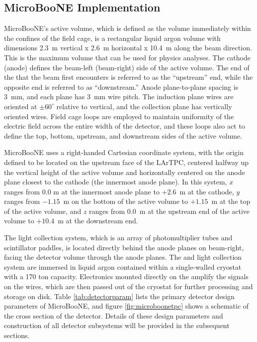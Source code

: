 


\subsection{MicroBooNE \lartpc Implementation}

MicroBooNE's \lartpc active volume, which is defined as the volume immediately within the confines of the \lartpc field cage, is a rectangular liquid argon volume with dimensions 2.3~m vertical x 2.6~m horizontal x 10.4~m along the beam direction. This is the maximum volume that can be used for physics analyses.  The cathode (anode) defines the beam-left (beam-right) side of the active volume.  The end of the \lartpc that the beam first encounters is referred to as the ``upstream'' end, while the opposite end is referred to as ``downstream.''  Anode plane-to-plane spacing is 3~mm, and each plane has 3~mm wire pitch. The induction plane wires are oriented at $\pm60^{\circ}$ relative to vertical, and the collection plane has vertically oriented wires. Field cage loops are employed to maintain uniformity of the electric field across the entire width of the detector, and these loops also act to define the top, bottom, upstream, and downstream sides of the active volume.  

MicroBooNE uses a right-handed Cartesian coordinate system, with the origin defined to be located on the upstream face of the LArTPC, centered halfway up the vertical height of the active volume and horizontally centered on the anode plane closest to the cathode (the innermost anode plane).  In this system, $x$ ranges from 0.0 m at the innermost anode plane to $+2.6$~m at the cathode, $y$ ranges from $-1.15$~m on the bottom of the active volume to $+1.15$~m at the top of the active volume, and $z$ ranges from 0.0~m at the upstream end of the active volume to $+10.4$~m at the downstream end.  

The light collection system, which is an array of photomultiplier tubes and scintillator paddles, is located directly behind the anode planes on beam-right, facing the detector volume through the anode planes.  The \lartpc and light collection system are immersed in liquid argon contained within a single-walled cryostat with a 170 ton capacity.  Electronics mounted directly on the \lartpc amplify the signals on the wires, which are then passed out of the cryostat for further processing and storage on disk.  Table \ref{tab:detectorparam} lists the primary detector design parameters of MicroBooNE, and figure \ref{fig:microboonetpc} shows a schematic of the cross section of the detector. Details of these design parameters and construction of all detector subsystems will be provided in the subsequent sections.

